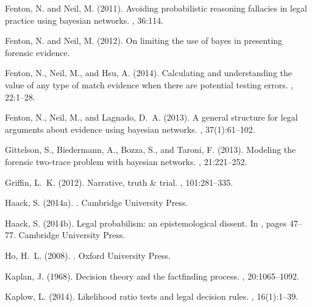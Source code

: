\documentclass[10pt,leqno]{article}
\begin{document}
\begin{thebibliography}{}
Fenton, N. and Neil, M. (2011).
\newblock Avoiding probabilistic reasoning fallacies in legal practice using
  bayesian networks.
, 36:114.

Fenton, N. and Neil, M. (2012).
\newblock On limiting the use of bayes in presenting forensic evidence.

Fenton, N., Neil, M., and Hsu, A. (2014).
\newblock Calculating and understanding the value of any type of match evidence
  when there are potential testing errors.
, 22:1--28.

Fenton, N., Neil, M., and Lagnado, D.~A. (2013).
\newblock A general structure for legal arguments about evidence using bayesian
  networks.
, 37(1):61--102.

Gittelson, S., Biedermann, A., Bozza, S., and Taroni, F. (2013).
\newblock Modeling the forensic two-trace problem with bayesian networks.
, 21:221--252.

Griffin, L.~K. (2012).
\newblock Narrative, truth \& trial.
, 101:281--335.

Haack, S. (2014a).
.
\newblock Cambridge University Press.

Haack, S. (2014b).
\newblock Legal probabilism: an epistemological dissent.
\newblock In {\em \cite{Haack2014-HAAEMS}}, pages 47--77. Cambridge University
  Press.

Ho, H.~L. (2008).
.
\newblock Oxford University Press.

Kaplan, J. (1968).
\newblock Decision theory and the factfinding process.
, 20:1065--1092.

Kaplow, L. (2014).
\newblock Likelihood ratio tests and legal decision rules.
, 16(1):1--39.


\end{thebibliography}
\end{document}
